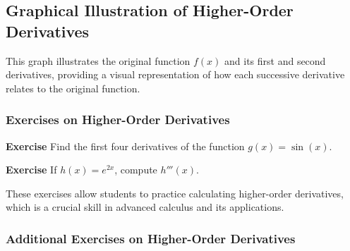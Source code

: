 \documentclass[a4paper,12pt]{book}
\newenvironment{exercise}[1][]
  {\par\medskip\noindent\textbf{Exercise #1} \rmfamily}
  {\medskip}
\begin{document}
\subsection{Graphical Illustration of Higher-Order Derivatives}

\begin{center}
\end{center}

This graph illustrates the original function \( f(x) \) and its first and second derivatives, providing a visual representation of how each successive derivative relates to the original function.

\subsubsection*{Exercises on Higher-Order Derivatives}

\begin{exercise}
Find the first four derivatives of the function \( g(x) = \sin(x) \).
\end{exercise}

\begin{exercise}
If \( h(x) = e^{2x} \), compute \( h'''(x) \).
\end{exercise}

These exercises allow students to practice calculating higher-order derivatives, which is a crucial skill in advanced calculus and its applications.

\subsubsection*{Additional Exercises on Higher-Order Derivatives}
\end{document}
